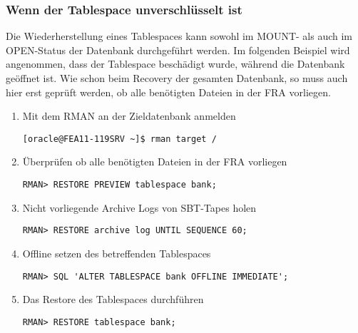         \subsubsection{Wenn der Tablespace unverschl\"usselt ist}
          Die Wiederherstellung eines Tablespaces kann sowohl im MOUNT- als auch im OPEN-Status der Datenbank durchgef\"uhrt werden. Im folgenden Beispiel wird angenommen, dass der Tablespace  besch\"adigt wurde, w\"ahrend die Datenbank ge\"offnet ist. Wie schon beim Recovery der gesamten Datenbank, so muss auch hier erst gepr\"uft werden, ob alle ben\"otigten Dateien in der FRA vorliegen.
          \begin{enumerate}
            \item Mit dem RMAN an der Zieldatenbank anmelden
              \begin{lstlisting}[caption={An der Zieldatenbank anmelden},label=admin1454,language=terminal]
[oracle@FEA11-119SRV ~]$ rman target /
              \end{lstlisting}
            \item \"Uberpr\"ufen ob alle ben\"otigten Dateien in der FRA vorliegen
              \begin{lstlisting}[caption={Voraussetzungen \"uberpr\"ufen},label=admin1455,language=rman]
RMAN> RESTORE PREVIEW tablespace bank;
              \end{lstlisting}
            \item Nicht vorliegende Archive Logs von SBT-Tapes holen
              \begin{lstlisting}[caption={Voraussetzungen \"uberpr\"ufen},label=admin1456,language=rman]
RMAN> RESTORE archive log UNTIL SEQUENCE 60;
              \end{lstlisting}
            \item Offline setzen des betreffenden Tablespaces
              \begin{lstlisting}[caption={Betreffenden Tablespace Offline
              setzen},label=admin1457,language=rman,emph={[10]ALTER,TABLESPACE,OFFLINE,IMMEDIATE},emphstyle={[10]\color{magenta}\bfseries}]
RMAN> SQL 'ALTER TABLESPACE bank OFFLINE IMMEDIATE';
              \end{lstlisting}
            \item Das Restore des Tablespaces durchf\"uhren
              \begin{lstlisting}[caption={Restore des betreffenden Tablespaces},label=admin1458,language=rman]
RMAN> RESTORE tablespace bank;
              \end{lstlisting}

\end{enumerate}
